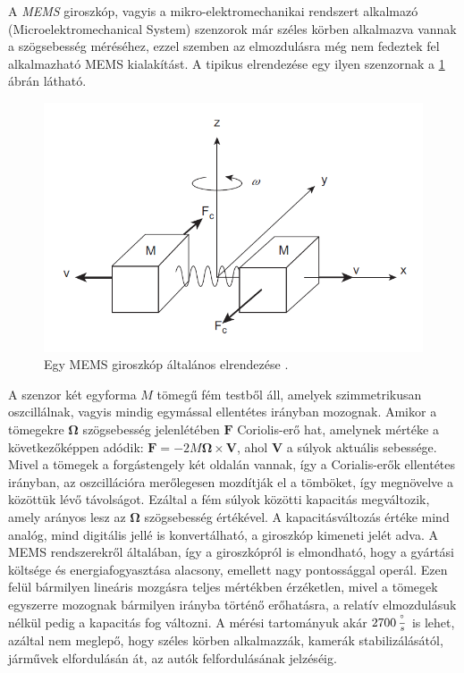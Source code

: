 A \textit{MEMS} giroszkóp, vagyis a mikro-elektromechanikai rendszert alkalmazó (Microelektromechanical System) szenzorok már széles körben alkalmazva vannak a szögsebesség méréséhez, ezzel szemben az elmozdulásra még nem fedeztek fel alkalmazható MEMS kialakítást. A tipikus elrendezése egy ilyen szenzornak a \ref{memsgyro} ábrán látható. 
\begin{figure}
	\centering
	\includegraphics[width=\columnwidth*7/10]{figures/memsgyro.png}
	\caption{Egy MEMS giroszkóp általános elrendezése \cite{Morris2016b}.}
	\label{memsgyro}
\end{figure}
A szenzor két egyforma $M$ tömegű fém testből áll, amelyek szimmetrikusan oszcillálnak, vagyis mindig egymással ellentétes irányban mozognak. Amikor a tömegekre $\mathbf{\Omega}$ szögsebesség jelenlétében $\mathbf{F}$ Coriolis-erő hat, amelynek mértéke a következőképpen adódik: $\mathbf{F}=-2M\mathbf{\Omega}\times \mathbf{V}$, ahol $\mathbf{V}$ a súlyok aktuális sebessége. Mivel a tömegek a forgástengely két oldalán vannak, így a Corialis-erők ellentétes irányban, az oszcillációra merőlegesen mozdítják el a tömböket, így megnövelve a közöttük lévő távolságot. Ezáltal a fém súlyok közötti kapacitás megváltozik, amely arányos lesz az $\mathbf{\Omega}$ szögsebesség értékével. A kapacitásváltozás értéke mind analóg, mind digitális jellé is konvertálható, a giroszkóp kimeneti jelét adva. A MEMS rendszerekről általában, így a giroszkópról is elmondható, hogy a gyártási költsége és energiafogyasztása alacsony, emellett nagy pontossággal operál. Ezen felül bármilyen lineáris mozgásra teljes mértékben érzéketlen, mivel a tömegek egyszerre mozognak bármilyen irányba történő erőhatásra, a relatív elmozdulásuk nélkül pedig a kapacitás fog változni. A mérési tartományuk akár $2700\,\frac{\degree}{s}$ is lehet, azáltal nem meglepő, hogy széles körben alkalmazzák, kamerák stabilizálásától, járművek elfordulásán át, az autók felfordulásának jelzéséig. 

